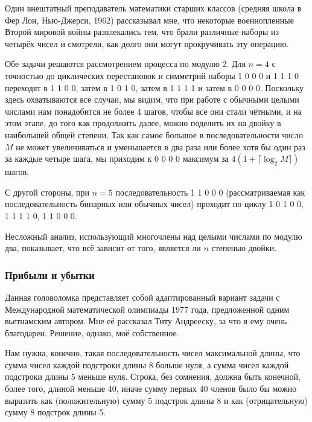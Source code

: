 \documentclass[twoside]{book}
\begin{document}
Один внештатный преподаватель математики старших классов (средняя школа в Фер Лон, Нью-Джерси, 1962)
рассказывал мне,
что некоторые военнопленные Второй мировой войны развлекались тем, что брали различные наборы из четырёх чисел и смотрели, как долго они могут прокручивать эту операцию.

\medskip

Обе задачи решаются рассмотрением процесса по модулю 2.
Для $n=4$ с точностью до циклических перестановок и симметрий наборы
1 0 0 0 
и
1 1 1 0 переходят в
1 1 0 0, затем в
1 0 1 0, затем в
1 1 1 1 и затем в
0 0 0 0.
Поскольку здесь охватываются все случаи, мы видим, что при работе с обычными целыми числами нам понадобится не более 4 шагов, чтобы все они стали чётными, и на этом этапе, до того как продолжить далее, можно поделить их на двойку в наибольшей общей степени.
Так как самое большое в последовательности число~$M$ не может увеличиваться и уменьшается в два раза или более хотя бы один раз за каждые четыре шага, 
мы приходим к 
0 0 0 0 
максимум за $4(1+\lceil\log_2 M\rceil)$ шагов.

С другой стороны, при $n=5$ последовательность 
1 1 0 0 0
(рассматриваемая как последовательность бинарных или обычных чисел)
проходит по циклу 
1 0 1 0 0, 
1 1 1 1 0, 
1 1 0 0 0.\heart 

Несложный анализ, использующий многочлены над целыми числами по модулю два, показывает, что всё зависит от того, является ли $n$ степенью двойки.

\subsubsection*{Прибыли и убытки}%

Данная головоломка представляет собой адаптированный вариант задачи с Международной математической олимпиады 1977 года,
предложенной одним вьетнамским автором.
Мне её рассказал Титу Андрееску, %
за что я ему очень благодарен.
Решение, однако, моё собственное.

\medskip

Нам нужна, конечно, такая последовательность чисел максимальной длины, что сумма чисел каждой подстроки длины 8 больше нуля, а сумма чисел каждой подстроки длины 5 меньше нуля.
Строка, без сомнения, должна быть конечной, более того, длиной меньше 40, иначе  сумму первых 40 членов было бы можно выразить как (положительную) сумму 5 подстрок длины 8 и как (отрицательную) сумму 8 подстрок длины 5.
\end{document}
